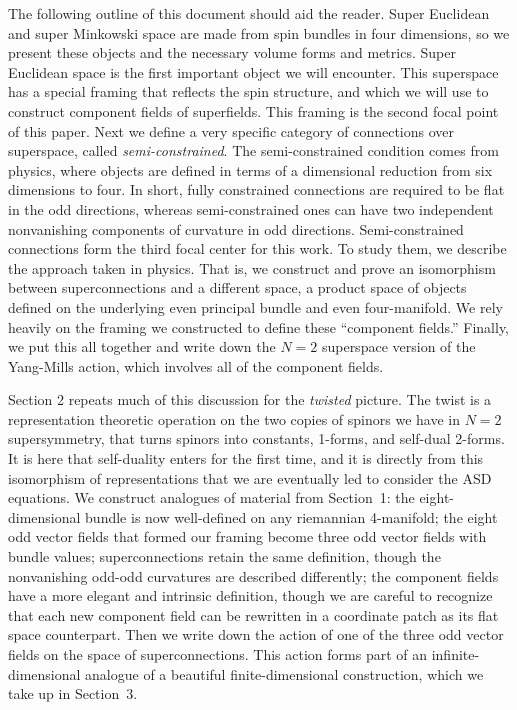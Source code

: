 \documentclass[twoside]{amsart}
\begin{document}
The following outline of this document should aid the reader.  Super
Euclidean and super Minkowski space are made from spin bundles in
four dimensions, so we present these objects and the necessary volume
forms and metrics.  Super Euclidean space is the first important
object we will encounter.  This superspace has a special framing that
reflects the spin structure, and which we will use to construct
component fields of superfields.  This framing is the second focal
point of this paper.  Next we define a very specific category of
connections over superspace, called \emph{semi-constrained}.  The
semi-constrained condition comes from physics, where objects are
defined in terms of a dimensional reduction from six dimensions to
four.  In short, fully constrained connections are required to be flat
in the odd directions, whereas semi-constrained ones can have two
independent nonvanishing components of curvature in odd directions.
Semi-constrained connections form the third focal center for this
work.  To study them, we describe the approach taken in physics.  That
is, we construct and prove an isomorphism between superconnections and
a different space, a product space of objects defined on the
underlying even principal bundle and even four-manifold.  We rely
heavily on the framing we constructed to define these ``component
fields.''  Finally, we put this all together and write down the \( N=2
\) superspace version of the Yang-Mills action, which involves all of
the component fields.

Section 2 repeats much of this discussion for the \emph{twisted}
picture.  The twist is a representation theoretic operation on the
two copies of spinors we have in \( N=2 \) supersymmetry, that turns
spinors into constants, 1-forms, and self-dual 2-forms.  It is here
that self-duality enters for the first time, and it is directly from
this isomorphism of representations that we are eventually led to
consider the ASD equations.  We construct analogues
of material from Section~1: the eight-dimensional bundle is now
well-defined on any riemannian 4-manifold; the eight odd vector
fields that formed our framing become three odd vector fields with
bundle values; superconnections retain the same definition, though the
nonvanishing odd-odd curvatures are described differently; the
component fields have a more elegant and intrinsic definition, though
we are careful to recognize that each new component field can be
rewritten in a coordinate patch as its flat space counterpart.  Then
we write down the action of one of the three odd vector fields on the
space of superconnections.  This action forms part of an infinite-dimensional
analogue of a beautiful finite-dimensional construction, which we take
up in Section~3.
\end{document}
